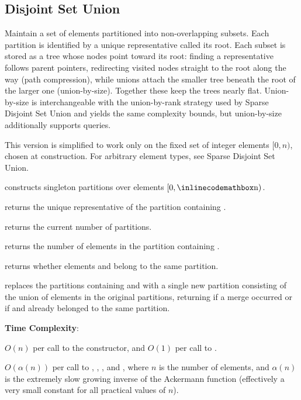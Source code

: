 \subsection{Disjoint Set Union}
\label{sec:2.8.1}
Maintain a set of elements partitioned into non-overlapping subsets. Each partition is identified by a unique representative called its root. Each subset is stored as a tree whose nodes point toward its root: finding a representative follows parent pointers, redirecting visited nodes straight to the root along the way (path compression), while unions attach the smaller tree beneath the root of the larger one (union-by-size). Together these keep the trees nearly flat. Union-by-size is interchangeable with the union-by-rank strategy used by Sparse Disjoint Set Union and yields the same complexity bounds, but union-by-size additionally supports  queries.

This version is simplified to work only on the fixed set of integer elements $[0, n)$, chosen at construction. For arbitrary element types, see Sparse Disjoint Set Union.

\begin{compactitem}
  \item {} constructs  singleton partitions over elements $[0, {\inlinecodemath{n}})$.
  \item {} returns the unique representative of the partition containing .
  \item {} returns the current number of partitions.
  \item {} returns the number of elements in the partition containing .
  \item {} returns whether elements  and  belong to the same partition.
  \item {} replaces the partitions containing  and  with a single new partition consisting of the union of elements in the original partitions, returning  if a merge occurred or  if  and  already belonged to the same partition.
\end{compactitem}

\textbf{Time Complexity}:
\begin{compactitem}
  \item $O(n)$ per call to the constructor, and $O(1)$ per call to .
  \item $O(\alpha\left(n\right))$ per call to , , , and , where $n$ is the number of elements, and $\alpha(n)$ is the extremely slow growing inverse of the Ackermann function (effectively a very small constant for all practical values of $n$).
\end{compactitem}

